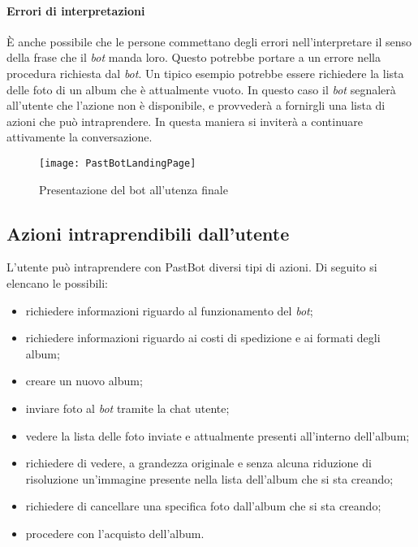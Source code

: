 \paragraph*{Errori di interpretazioni} È anche possibile che le persone
commettano degli errori nell'interpretare il senso della frase che il
\textit{bot} manda loro. Questo potrebbe portare a un errore nella procedura
richiesta dal \textit{bot}. Un tipico esempio potrebbe essere richiedere la
lista delle foto di un album che è attualmente vuoto. In questo caso il
\textit{bot} segnalerà all'utente che l'azione non è disponibile, e provvederà
a fornirgli una lista di azioni che può intraprendere. In questa maniera si
inviterà a continuare attivamente la conversazione.

\begin{figure}[H]
  \centering
  \texttt{[image: PastBotLandingPage]}
  \caption{Presentazione del bot all'utenza finale}
\end{figure}

\subsection{Azioni intraprendibili dall'utente}

L'utente può intraprendere con PastBot diversi tipi di azioni. Di seguito si
elencano le possibili:

\begin{itemize}

  \item richiedere informazioni riguardo al funzionamento del \textit{bot};
  \item richiedere informazioni riguardo ai costi di spedizione e ai formati
degli album;
  \item creare un nuovo album;
  \item inviare foto al \textit{bot} tramite la chat utente;
  \item vedere la lista delle foto inviate e attualmente presenti all'interno
dell'album;
  \item richiedere di vedere, a grandezza originale e senza alcuna riduzione di
risoluzione un'immagine presente nella lista dell'album che si sta creando;
  \item richiedere di cancellare una specifica foto dall'album che si sta
creando;
  \item procedere con l'acquisto dell'album.
\end{itemize}

